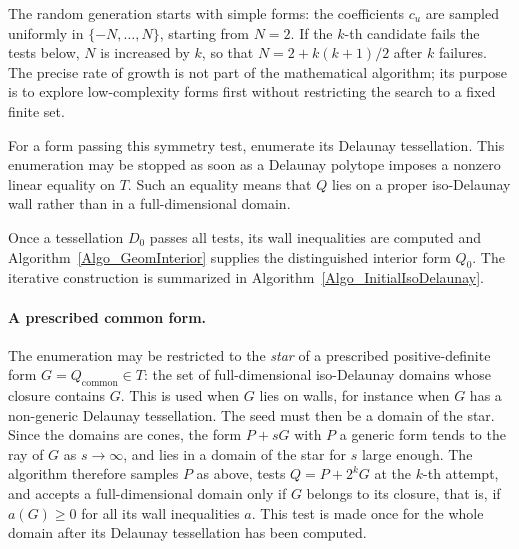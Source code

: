 \documentclass{amsart}
\begin{document}
The random generation starts with simple forms: the coefficients \(c_u\) are
sampled uniformly in \(\{-N,\ldots,N\}\), starting from \(N=2\).  If the
\(k\)-th candidate fails the tests below, \(N\) is increased by \(k\), so that
\(N=2+k(k+1)/2\) after \(k\) failures.  The precise rate of growth is not part
of the mathematical algorithm; its purpose is to explore low-complexity forms
first without restricting the search to a fixed finite set.

For a form passing this symmetry test, enumerate its Delaunay tessellation.
This enumeration may be stopped as soon as a Delaunay polytope imposes a
nonzero linear equality on \(T\).  Such an equality means that \(Q\) lies on a
proper iso-Delaunay wall rather than in a full-dimensional domain.

Once a tessellation \(D_0\) passes all tests, its wall inequalities are
computed and Algorithm~\ref{Algo_GeomInterior} supplies the distinguished
interior form \(Q_0\).  The iterative construction is summarized in
Algorithm~\ref{Algo_InitialIsoDelaunay}.

\paragraph{A prescribed common form.}
The enumeration may be restricted to the \emph{star} of a prescribed
positive-definite form \(G=Q_{\mathrm{common}}\in T\): the set of
full-dimensional iso-Delaunay domains whose closure contains \(G\).  This is
used when \(G\) lies on walls, for instance when \(G\) has a non-generic
Delaunay tessellation.  The seed must then be a domain of the star.  Since
the domains are cones, the form \(P+sG\) with \(P\) a generic form tends to
the ray of \(G\) as \(s\to\infty\), and lies in a domain of the star for \(s\)
large enough.  The algorithm therefore samples \(P\) as above, tests
\(Q=P+2^kG\) at the \(k\)-th attempt, and accepts a full-dimensional domain
only if \(G\) belongs to its closure, that is, if \(a(G)\geq 0\) for all its
wall inequalities \(a\).  This test is made once for the whole domain after
its Delaunay tessellation has been computed.
\end{document}
